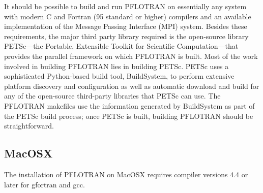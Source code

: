 \documentclass[12pt]{article}
\begin{document}
It should be possible to build and run PFLOTRAN on essentially any system with 
modern C and Fortran (95 standard or higher) compilers and an available 
implementation of the Message Passing Interface (MPI) system.
Besides these requirements, the major third party library required is 
the open-source library PETSc---the Portable, Extensible Toolkit for Scientific 
Computation---that provides the parallel framework on which PFLOTRAN is 
built.
Most of the work involved in building PFLOTRAN lies in building PETSc. 
PETSc uses a sophisticated Python-based build tool, BuildSystem, to perform 
extensive platform discovery and configuration as well as automatic download 
and build for any of the open-source third-party libraries that PETSc can 
use. 
The PFLOTRAN makefiles use the information generated by BuildSystem as part 
of the PETSc build process; once PETSc is built, building PFLOTRAN should be 
straightforward.

\subsection{MacOSX}

The installation of PFLOTRAN on MacOSX requires compiler versions 4.4 or later for gfortran and gcc. 

\end{document}

